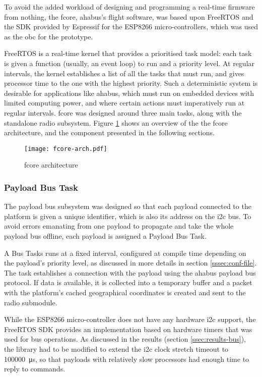 To avoid the added workload of designing and programming a real-time firmware
from nothing, the \acrfull{fcore}, \acrshort{ahabus}'s flight software, was
based upon FreeRTOS and the SDK provided by Espressif for the ESP8266
micro-controllers, which was used as the \acrshort{obc} for the prototype.

FreeRTOS is a real-time kernel that provides a prioritised task model: each task
is given a function (usually, an event loop) to run and a priority level. At
regular intervals, the kernel establishes a list of all the tasks that must run,
and gives processor time to the one with the highest priority. Such a
deterministic system is desirable for applications like \acrshort{ahabus}, which
must run on embedded devices with limited computing power, and where certain
actions must imperatively run at regular intervals. \acrshort{fcore} was
designed around three main tasks, along with the standalone radio subsystem.
Figure \ref{fig:fcore-arch} shows an overview of the the \acrshort{fcore}
architecture, and the component presented in the following sections.

\begin{figure}[H]
\texttt{[image: fcore-arch.pdf]}
\centering
\caption{\acrshort{fcore} architecture}
\label{fig:fcore-arch}
\end{figure}

\subsubsection{Payload Bus Task}

The payload bus subsystem was designed so that each payload connected to the
platform is given a unique identifier, which is also its address on the
\acrshort{i2c} bus. To avoid errors emanating from one payload to propagate
and take the whole payload bus offline, each payload is assigned a Payload
Bus Task.

A Bus Tasks runs at a fixed interval, configured at compile time depending on
the payload's priority level, as discussed in more details in section
\ref{sssec:conf-file}. The task establishes a connection with the payload using
the \acrshort{ahabus} payload bus protocol. If data is available, it is
collected into a temporary buffer and a packet with the platform's cached
geographical coordinates is created and sent to the radio submodule.

While the ESP8266 micro-controller does not have any hardware \acrshort{i2c}
support, the FreeRTOS SDK provides an implementation based on hardware timers
that was used for bus operations. As discussed in the results (section
\ref{ssec:results-bus}), the library had to be modified to extend the
\acrshort{i2c} clock stretch timeout to \SI{100000}{\micro\second}, so that
payloads with relatively slow processors had enough time to reply to commands.


